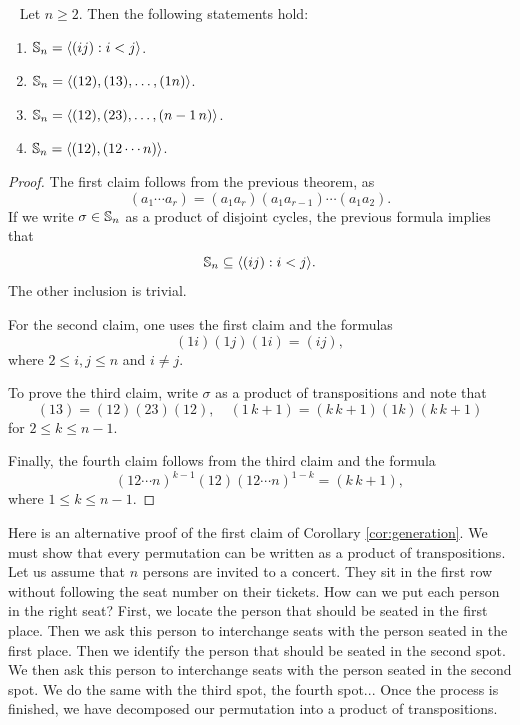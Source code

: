 \begin{corollary}\
\label{cor:generation}
Let $n\geq2$. Then the following statements hold: 
        \begin{enumerate}
                \item $\mathbb{S}_n=\langle (ij):i<j\rangle$.
                \item $\mathbb{S}_n=\langle (12),(13),\dots,(1n)\rangle$.
                \item $\mathbb{S}_n=\langle (12),(23),\dots,(n-1\,n)\rangle$.
                \item $\mathbb{S}_n=\langle (12),(12\cdots n)\rangle$.
        \end{enumerate}
\end{corollary}

\begin{proof}
        The first claim follows from the previous theorem, as 
        \[
        (a_1\cdots a_r)=(a_1a_r)(a_1a_{r-1})\cdots(a_1a_2).
        \]
        If we write $\sigma\in\mathbb{S}_n$ as a product of disjoint cycles, 
        the previous formula implies 
        that 
        \[
        \mathbb{S}_n\subseteq\langle (ij):i<j\rangle.
        \]
        The other 
        inclusion is trivial. 

        For the second claim, one uses the first claim and the
        formulas 
        \[
        (1i)(1j)(1i)=(ij), 
        \]
        where $2\leq i,j\leq n$ and $i\ne j$.

        To prove the third claim, write $\sigma$ as a product 
        of transpositions and 
        note that 
        \[
        (13)=(12)(23)(12),\quad
        (1\,k+1)=(k\,k+1)(1k)(k\,k+1)
        \]
        for $2\leq k\leq n-1$.

        Finally, the fourth claim follows from 
        the third claim and 
        the formula 
        \[
        (12\cdots n)^{k-1}(12)(12\cdots n)^{1-k}=(k\,k+1),
        \]
        where $1\leq k\leq n-1$.
\end{proof}

Here is an alternative proof of
the first claim of Corollary 
\ref{cor:generation}. We must show that every 
permutation can be written as a product of transpositions. 
Let us assume that $n$ persons are invited to a concert. They sit
in the first row without following  
the seat number on their tickets. How can we put each person in 
the right seat? First, we locate the person that should be seated 
in the first place. Then we ask this person to 
interchange seats with the person seated in the first place. 
Then we identify the person 
that should be seated in the second spot. We then ask this person
to interchange seats with the person 
seated in the second spot. We do the same with the third spot, the fourth
spot... Once the process is finished, 
we have decomposed 
our permutation into a product of transpositions. 

